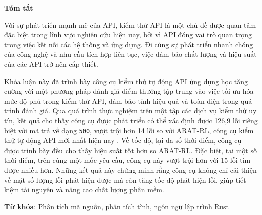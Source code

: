 \begin{center}
\textbf{\large{Tóm tắt}	}
\end{center}


\begin{small}
Với sự phát triển mạnh mẽ của API, kiểm thử  API là một chủ đề được quan tâm đặc biệt trong lĩnh vực nghiên cứu hiện nay, bởi vì API đóng vai trò quan trọng trong việc kết nối các hệ thống và ứng dụng. Đi cùng sự phát triển nhanh chóng của công nghệ và nhu cầu tích hợp liên tục, việc đảm bảo chất lượng và hiệu suất của các API trở nên cấp thiết.

Khóa luận này đã trình bày công cụ kiểm thử tự động API ứng dụng học tăng cường với một phương pháp đánh giá điểm thưởng tập trung vào việc tối ưu hóa mức độ phủ trong kiểm thử API, đảm bảo tính hiệu quả và toàn diện trong quá trình đánh giá. 
Qua quá trình thực nghiệm trên một tập các dịch vụ kiểm thử  uy tín, kết quả cho thấy công cụ được phát triển có thể xác định được 126,9 lỗi riêng biệt với mã trả về dạng \texttt{500}, vượt trội hơn 14 lỗi so với ARAT-RL, công cụ kiểm thử tự động API mới nhất hiện nay \cite{kim2023adaptive}. Về tốc độ, tại đa số thời điểm, công cụ được trình bày đều cho thấy hiệu suất tốt hơn so ARAT-RL. Đặc biệt, tại một số thời điểm, trên cùng một mốc yêu cầu, công cụ này vượt trội hơn với 15 lỗi tìm được nhiều hơn. Những kết quả này chứng minh rằng công cụ không chỉ cải thiện về mặt số lượng lỗi phát hiện được mà còn tăng tốc độ phát hiện lỗi, giúp tiết kiệm tài nguyên và nâng cao chất lượng phần mềm.


\vspace*{1cm}
\textbf{Từ khóa}: Phân tích mã nguồn, phân tích tĩnh, ngôn ngữ lập trình Rust

\end{small}